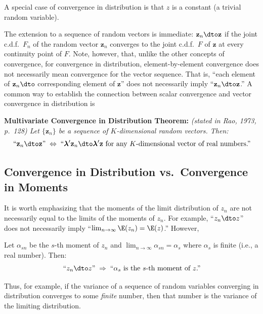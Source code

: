 A special case of convergence in distribution is that $z$ is a constant (a trivial
random variable).

The extension to a sequence of random vectors is immediate: $\mathbf{z}_n \dto \mathbf{z}$
if the joint c.d.f.\ $F_n$ of the random vector $\mathbf{z}_n$ converges to the joint
c.d.f.\ $F$ of $\mathbf{z}$ at every continuity point of $F$.  Note, however, that,
unlike the other concepts of convergence, for convergence in distribution,
element-by-element convergence does not necessarily mean convergence for the
vector sequence.  That is, ``each element of $\mathbf{z}_n \dto$ corresponding element
of $\mathbf{z}$'' does not necessarily imply ``$\mathbf{z}_n \dto \mathbf{z}$.''
A common way to establish the connection between scalar convergence and vector
convergence in distribution is

\medskip
\noindent\textbf{Multivariate Convergence in Distribution Theorem:}\quad
\emph{(stated in Rao, 1973, p.~128) Let $\{\mathbf{z}_n\}$ be a sequence of
$K$-dimensional random vectors.  Then:}
\[
  \text{``}\mathbf{z}_n \dto \mathbf{z}\text{''} \;\Leftrightarrow\;
  \text{``}\bm{\lambda}'\mathbf{z}_n \dto \bm{\lambda}'\mathbf{z}
  \text{ for any $K$-dimensional vector of real numbers.''}\!
\]

\subsection*{Convergence in Distribution vs.\ Convergence in Moments}

It is worth emphasizing that the moments of the limit distribution of $z_n$ are not
necessarily equal to the limits of the moments of $z_n$.  For example,
``$z_n \dto z$'' does not necessarily imply
``$\lim_{n \to \infty} \E(z_n) = \E(z)$.''  However,

\begin{lemma}
\label{lem:2.1}
Let $\alpha_{sn}$ be the $s$-th moment of $z_n$ and
$\lim_{n \to \infty} \alpha_{sn} = \alpha_s$ where $\alpha_s$ is finite
(i.e., a real number).  Then:
\[
  \text{``}z_n \dto z\text{''} \;\Rightarrow\;
  \text{``$\alpha_s$ is the $s$-th moment of $z$.''}\!
\]
\end{lemma}

Thus, for example, if the variance of a sequence of random variables converging
in distribution converges to some \emph{finite} number, then that number is the
variance of the limiting distribution.

